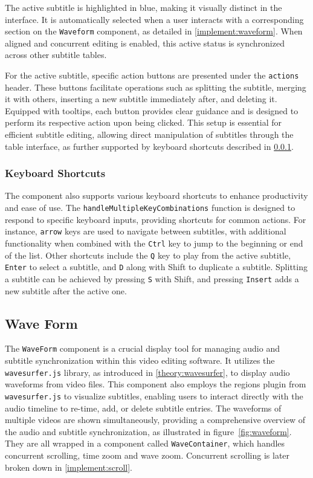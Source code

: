 The active subtitle is highlighted in blue, making it visually distinct in the interface. It is automatically selected when a user interacts with a corresponding section on the \texttt{Waveform} component, as detailed in \ref{implement:waveform}. When aligned and concurrent editing is enabled, this active status is synchronized across other subtitle tables.

For the active subtitle, specific action buttons are presented under the \texttt{actions} header. These buttons facilitate operations such as splitting the subtitle, merging it with others, inserting a new subtitle immediately after, and deleting it. Equipped with tooltips, each button provides clear guidance and is designed to perform its respective action upon being clicked. This setup is essential for efficient subtitle editing, allowing direct manipulation of subtitles through the table interface, as further supported by keyboard shortcuts described in \ref{implement:subtitletable:keyboard}.

\subsubsection{Keyboard Shortcuts}
\label{implement:subtitletable:keyboard}

The component also supports various keyboard shortcuts to enhance productivity and ease of use. The \texttt{handleMultipleKeyCombinations} function is designed to respond to specific keyboard inputs, providing shortcuts for common actions. For instance, \texttt{arrow} keys are used to navigate between subtitles, with additional functionality when combined with the \texttt{Ctrl} key to jump to the beginning or end of the list. Other shortcuts include the \texttt{Q} key to play from the active subtitle, \texttt{Enter} to select a subtitle, and \texttt{D} along with Shift to duplicate a subtitle. Splitting a subtitle can be achieved by pressing \texttt{S} with Shift, and pressing \texttt{Insert} adds a new subtitle after the active one.

\subsection{Wave Form}

The \texttt{WaveForm} component is a crucial display tool for managing audio and subtitle synchronization within this video editing software. It utilizes the \texttt{wavesurfer.js} library, as introduced in \ref{theory:wavesurfer}, to display audio waveforms from video files. This component also employs the regions plugin from \texttt{wavesurfer.js} to visualize subtitles, enabling users to interact directly with the audio timeline to re-time, add, or delete subtitle entries. The waveforms of multiple videos are shown simultaneously, providing a comprehensive overview of the audio and subtitle synchronization, as illustrated in figure~\ref{fig:waveform}. They are all wrapped in a component called \texttt{WaveContainer}, which handles concurrent scrolling, time zoom and wave zoom. Concurrent scrolling is later broken down in \ref{implement:scroll}.

